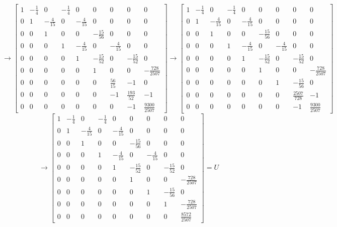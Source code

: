 \documentclass[a4paper]{article}
\begin{document}
$$
\rightarrow\left[\begin{array}{ccccccccc}
	1 & -\frac{1}{4} & 0 & -\frac{1}{4} & 0 & 0 & 0 & 0 & 0 \\
	0 & 1 & -\frac{4}{15} & 0 & -\frac{4}{15} & 0 & 0 & 0 & 0 \\
	0 & 0 & 1 & 0 & 0 & -\frac{15}{56} & 0 & 0 & 0 \\
	0 & 0 & 0 & 1 & -\frac{4}{15} & 0 & -\frac{4}{15} & 0 & 0 \\
	0 & 0 & 0 & 0 & 1 & -\frac{15}{52} & 0 & -\frac{15}{52} & 0 \\
	0 & 0 & 0 & 0 & 0 & 1 & 0 & 0 & -\frac{728}{2507} \\
	0 & 0 & 0 & 0 & 0 & 0 & \frac{56}{15} & -1 & 0 \\
	0 & 0 & 0 & 0 & 0 & 0 & -1 & \frac{193}{52} & -1 \\
	0 & 0 & 0 & 0 & 0 & 0 & 0 & -1 & \frac{9300}{2507}
\end{array}\right] \rightarrow\left[\begin{array}{ccccccccc}
	1 & -\frac{1}{4} & 0 & -\frac{1}{4} & 0 & 0 & 0 & 0 & 0 \\
	0 & 1 & -\frac{4}{15} & 0 & -\frac{4}{15} & 0 & 0 & 0 & 0 \\
	0 & 0 & 1 & 0 & 0 & -\frac{15}{56} & 0 & 0 & 0 \\
	0 & 0 & 0 & 1 & -\frac{4}{15} & 0 & -\frac{4}{15} & 0 & 0 \\
	0 & 0 & 0 & 0 & 1 & -\frac{15}{52} & 0 & -\frac{15}{52} & 0 \\
	0 & 0 & 0 & 0 & 0 & 1 & 0 & 0 & -\frac{728}{2507} \\
	0 & 0 & 0 & 0 & 0 & 0 & 1 & -\frac{15}{56} & 0 \\
	0 & 0 & 0 & 0 & 0 & 0 & 0 & \frac{2507}{728} & -1 \\
	0 & 0 & 0 & 0 & 0 & 0 & 0 & -1 & \frac{9300}{2507}
\end{array}\right]
$$
$$
\rightarrow\left[\begin{array}{ccccccccc}
	1 & -\frac{1}{4} & 0 & -\frac{1}{4} & 0 & 0 & 0 & 0 & 0 \\
	0 & 1 & -\frac{4}{15} & 0 & -\frac{4}{15} & 0 & 0 & 0 & 0 \\
	0 & 0 & 1 & 0 & 0 & -\frac{15}{56} & 0 & 0 & 0 \\
	0 & 0 & 0 & 1 & -\frac{4}{15} & 0 & -\frac{4}{15} & 0 & 0 \\
	0 & 0 & 0 & 0 & 1 & -\frac{15}{52} & 0 & -\frac{15}{52} & 0 \\
	0 & 0 & 0 & 0 & 0 & 1 & 0 & 0 & -\frac{728}{2507} \\
	0 & 0 & 0 & 0 & 0 & 0 & 1 & -\frac{15}{56} & 0 \\
	0 & 0 & 0 & 0 & 0 & 0 & 0 & 1 & -\frac{728}{2507} \\
	0 & 0 & 0 & 0 & 0 & 0 & 0 & 0 & \frac{8572}{2507}
\end{array}\right]=U
$$
\end{document}

